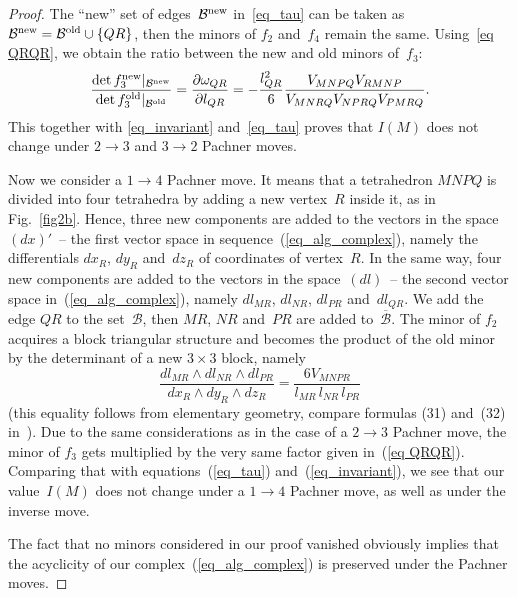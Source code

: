 \documentclass[pdftex]{sigma}
\begin{document}
\begin{proof}
The ``new'' set of edges~$\mathcal B^{\rm new}$ in~\eqref{eq_tau} can be taken as $\mathcal B^{\rm new} = \mathcal B^{\rm old} \cup\{QR\}$, then the minors of $f_2$ and~$f_4$ remain the same. Using~\eqref{eq QRQR}, we obtain the ratio between the new and old minors of~$f_3$:
\begin{equation}
\frac{\det f_3^{\rm new} |_{\mathcal B^{\rm new}}}{\det f_3^{\rm old} |_{\mathcal B^{\rm old}}} = \frac{\partial\omega_{QR}}{\partial l_{QR}} = - \frac{l_{QR}^2}{6}\frac{V_{MNPQ}V_{RMNP}}{V_{MNRQ}V_{NPRQ}V_{PMRQ}}  .
\label{eq QRQR minors}
\end{equation}
This together with \eqref{eq_invariant} and~\eqref{eq_tau} proves that $I(M)$ does not change under $2\to 3$ and $3\to 2$ Pachner moves.

Now we consider a $1\to 4$ Pachner move. It means that a tetrahedron $MNPQ$ is divided into four tetrahedra by adding a new vertex~$R$ inside it, as in Fig.~\ref{fig2b}. Hence, three new components are added to the vectors in the space~$(dx)'$~-- the f\/irst vector space in sequence~(\ref{eq_alg_complex}), namely the dif\/ferentials $dx_R$, $dy_R$ and~$dz_R$ of coordinates of vertex~$R$. In the same way, four new components are added to the vectors in the space~$(dl)$~-- the second vector space in~(\ref{eq_alg_complex}), namely $dl_{MR}$, $dl_{NR}$, $dl_{PR}$ and~$dl_{QR}$. We add the edge $QR$ to the set~$\mathcal B$, then $MR$, $NR$ and~$PR$ are added to~$\overline{\mathcal B}$. The minor of $f_2$ acquires a block triangular structure and becomes the product of the old minor by the determinant of a new $3\times 3$ block, namely
\begin{equation*}
\frac{dl_{MR}\wedge dl_{NR}\wedge dl_{PR}}{dx_R\wedge dy_R\wedge dz_R} = \frac{6V_{MNPR}}{l_{MR}\,l_{NR}\,l_{PR}}
\end{equation*}
(this equality follows from elementary geometry, compare formulas (31) and~(32) in~\cite{JNMP1}). Due to the same considerations as in the case of a $2\to 3$ Pachner move, the minor of $f_3$ gets multiplied by the very same factor given in~(\ref{eq QRQR}). Comparing that with equations~(\ref{eq_tau}) and~(\ref{eq_invariant}), we see that our value~$I(M)$ does not change under a $1\to 4$ Pachner move, as well as under the inverse move.

The fact that no minors considered in our proof vanished obviously implies that the acyclicity of our complex~(\ref{eq_alg_complex}) is preserved under the Pachner moves.
\end{proof}
\end{document}
